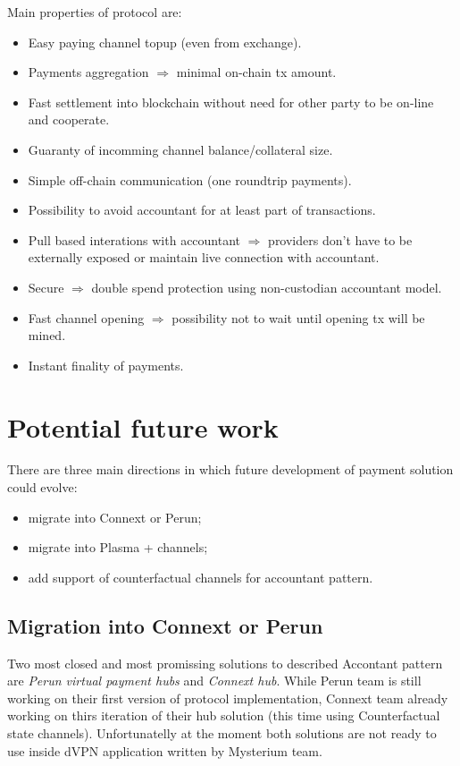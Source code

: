 \documentclass[a4paper,12pt]{article}
\begin{document}
Main properties of protocol are:

\begin{itemize}
  \item Easy paying channel topup (even from exchange).
  \item Payments aggregation $\Longrightarrow$ minimal on-chain tx amount.
  \item Fast settlement into blockchain without need for other party to be 
  on-line and cooperate.
  \item Guaranty of incomming channel balance/collateral size.
  \item Simple off-chain communication (one roundtrip payments).
  \item Possibility to avoid accountant for at least part of transactions.
  \item Pull based interations with accountant $\Longrightarrow$ providers don't 
  have to be externally exposed or maintain live connection with accountant.
  \item Secure $\Longrightarrow$ double spend protection using non-custodian 
  accountant model.
  \item Fast channel opening $\Longrightarrow$ possibility not to wait until 
  opening tx will be mined.
  \item Instant finality of payments.
\end{itemize}

\section{Potential future work}

There are three main directions in which future development of payment solution
could evolve: 
\begin{itemize}
    \item migrate into Connext or Perun;
    \item migrate into Plasma + channels;
    \item add support of counterfactual channels for accountant pattern.
\end{itemize}

\subsection{Migration into Connext or Perun}

Two most closed and most promissing solutions to described Accontant pattern are
\textit{Perun virtual payment hubs} and \textit{Connext hub}. While Perun team 
is still working on their first version of protocol implementation, Connext team 
already working on thirs iteration of their hub solution (this time using 
Counterfactual state channels). Unfortunatelly at the moment both solutions are
not ready to use inside dVPN application written by Mysterium team. 
\end{document}
